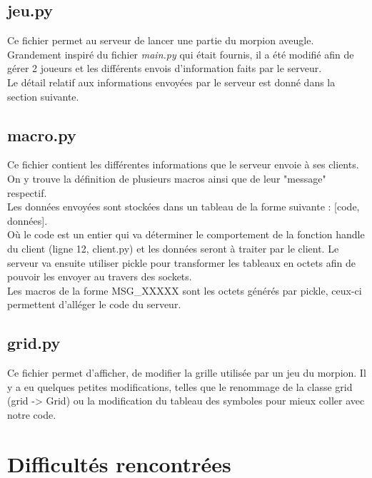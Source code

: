 \documentclass[11pt]{report}
\begin{document}
\subsection{jeu.py}

Ce fichier permet au serveur de lancer une partie du morpion aveugle.
Grandement inspiré du fichier \textit{main.py} qui était fournis, il a été modifié
afin de gérer 2 joueurs et les différents envois d'information faits par le
serveur. \\
Le détail relatif aux informations envoyées par le serveur est donné dans la
section suivante.

\subsection{macro.py}

Ce fichier contient les différentes informations que le serveur envoie à ses
clients. On y trouve la définition de plusieurs macros ainsi que de leur
"message" respectif. \\
Les données envoyées sont stockées dans un tableau de la
forme suivante : [code, données]. \\
Où le code est un entier qui va déterminer le comportement de la fonction
handle du client (ligne 12, client.py)
et les données seront à traiter par le client. Le serveur va ensuite utiliser
pickle pour transformer les tableaux en octets afin de pouvoir les envoyer
au travers des sockets. \\
Les macros de la forme MSG\_XXXXX sont les octets générés par pickle,
ceux-ci permettent d'alléger le code du serveur.

\subsection{grid.py}

Ce fichier permet d'afficher, de modifier la grille utilisée par un jeu du
morpion. Il y a eu quelques petites modifications, telles que le renommage de
la classe grid (grid -> Grid) ou la modification du tableau des symboles pour
mieux coller avec notre code.


\newpage

\section{Difficultés rencontrées}
\end{document}
